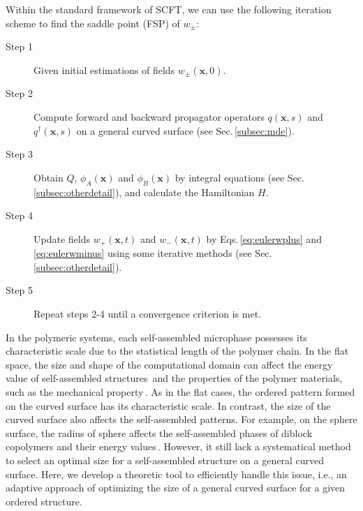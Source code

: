 \documentclass[final,1p,times]{elsarticle}
\newcommand{\bx}{\mathbf{x}}
\begin{document}
Within the standard framework of SCFT, we can use the following 
iteration scheme to find the saddle point (FSP) of $w_\pm$:
\begin{description}
	\item[Step 1] Given initial estimations of fields $w_\pm(\bx, 0)$.
    \item[Step 2] Compute forward and backward propagator operators
		$q(\bx,s)$ and $q^\dag(\bx,s)$ on a general curved
		surface (see Sec.\,\ref{subsec:mde}).
	\item[Step 3] Obtain $Q$, $\phi_A(\bx)$ and $\phi_B(\bx)$ by
		integral equations (see Sec.\,\ref{subsec:otherdetail}), and calculate
        the Hamiltonian $H$.
	\item[Step 4] Update fields $w_+(\bx,t)$ and $w_-(\bx,t)$ by 
		Eqs.\,\eqref{eq:eulerwplus} and \eqref{eq:eulerwminus}
		using some iterative methods (see Sec.\,\ref{subsec:otherdetail}). 
	\item[Step 5] Repeat steps 2-4 until a convergence criterion
		is met.
\end{description}

In the polymeric systems, each self-assembled microphase possesses its
characteristic scale due to the statistical length of the polymer chain.  In
the flat space, the size and shape of the computational domain can
affect the energy value of self-assembled structures\,\cite{matsen1994stable,
jiang2013discovery} and the properties of the polymer materials, such as the
mechanical property\,\cite{barrat2005introducing, tyler2003stress}.  As in the
flat cases, the ordered pattern formed on the curved surface has its
characteristic scale. In contrast, the size of the curved surface also affects the
self-assembled patterns.  For example, on the sphere surface, the radius of
sphere affects the self-assembled phases of diblock copolymers and their energy
values\,\cite{chantawansri2007}.  However, it still lack a systematical
method to select an optimal size for a self-assembled structure on a
general curved surface. Here, we develop a theoretic tool to efficiently handle
this issue, i.e., an adaptive approach of optimizing the size of a general
curved surface for a given ordered structure.
\end{document}
